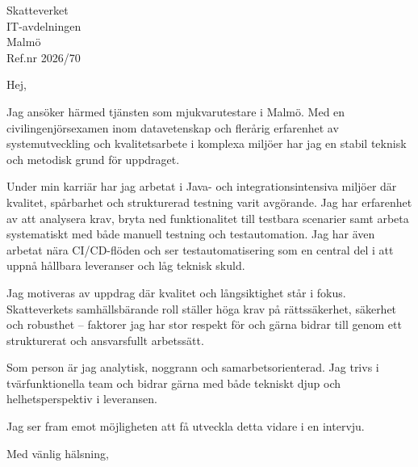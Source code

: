 \documentclass[11pt,a4paper]{letter}
\begin{document}
\begin{letter}{
Skatteverket \\
IT-avdelningen \\
Malmö \\
Ref.nr 2026/70
}

\opening{Hej,}

Jag ansöker härmed tjänsten som mjukvarutestare i Malmö. Med en civilingenjörsexamen inom datavetenskap och flerårig erfarenhet av systemutveckling och kvalitetsarbete i komplexa miljöer har jag en stabil teknisk och metodisk grund för uppdraget.

Under min karriär har jag arbetat i Java- och integrationsintensiva miljöer där kvalitet, spårbarhet och strukturerad testning varit avgörande. Jag har erfarenhet av att analysera krav, bryta ned funktionalitet till testbara scenarier samt arbeta systematiskt med både manuell testning och testautomation. Jag har även arbetat nära CI/CD-flöden och ser testautomatisering som en central del i att uppnå hållbara leveranser och låg teknisk skuld.

Jag motiveras av uppdrag där kvalitet och långsiktighet står i fokus. Skatteverkets samhällsbärande roll ställer höga krav på rättssäkerhet, säkerhet och robusthet – faktorer jag har stor respekt för och gärna bidrar till genom ett strukturerat och ansvarsfullt arbetssätt.

Som person är jag analytisk, noggrann och samarbetsorienterad. Jag trivs i tvärfunktionella team och bidrar gärna med både tekniskt djup och helhetsperspektiv i leveransen.

Jag ser fram emot möjligheten att få utveckla detta vidare i en intervju.

\closing{Med vänlig hälsning,}

\end{letter}
\end{document}
